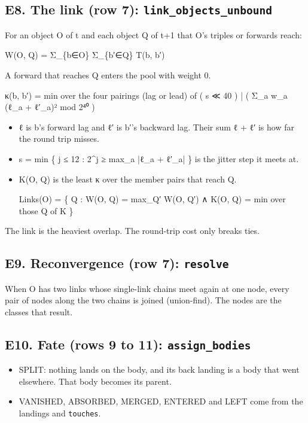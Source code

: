 \subsection{\texorpdfstring{E8. The link (row 7): \texttt{link\_\allowbreak{}objects\_\allowbreak{}unbound}}{E8. The link (row 7): link\_objects\_unbound}}

For an object O of t and each object Q of t+1 that O's triples or forwards reach:

W(O, Q) = Σ\_\allowbreak{}\{b∈O\} Σ\_\allowbreak{}\{b′∈Q\} T(b, b′)

A forward that reaches Q enters the pool with weight 0.

κ(b, b′) = min over the four pairings (lag or lead) of  ( s ≪ 40 ) | ( Σ\_\allowbreak{}a w\_\allowbreak{}a (ℓ\_\allowbreak{}a + ℓ′\_\allowbreak{}a)²  mod 2⁴⁰ )

\begin{itemize}
\item ℓ is b's forward lag and ℓ′ is b′'s backward lag. Their sum ℓ + ℓ′ is how far the round trip misses.
\item s = min \{ j ≤ 12 : 2\textasciicircum{}j ≥ max\_\allowbreak{}a |ℓ\_\allowbreak{}a + ℓ′\_\allowbreak{}a| \} is the jitter step it meets at.
\item K(O, Q) is the least κ over the member pairs that reach Q.

Links(O) = \{ Q : W(O, Q) = max\_\allowbreak{}Q′ W(O, Q′) ∧ K(O, Q) = min over those Q of K \}
\end{itemize}

The link is the heaviest overlap. The round-trip cost only breaks ties.

\subsection{\texorpdfstring{E9. Reconvergence (row 7): \texttt{resolve}}{E9. Reconvergence (row 7): resolve}}

When O has two links whose single-link chains meet again at one node, every pair of nodes along the two chains is joined (union-find). The nodes are the classes that result.

\subsection{\texorpdfstring{E10. Fate (rows 9 to 11): \texttt{assign\_\allowbreak{}bodies}}{E10. Fate (rows 9 to 11): assign\_bodies}}

\begin{itemize}
\item SPLIT: nothing lands on the body, and its back landing is a body that went elsewhere. That body becomes its parent.
\item VANISHED, ABSORBED, MERGED, ENTERED and LEFT come from the landings and \texttt{touches}.
\end{itemize}

